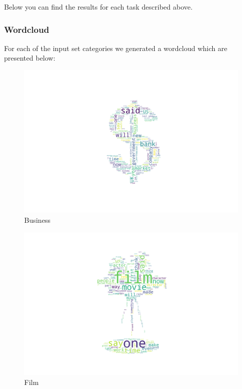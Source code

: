 Below you can find the results for each task described above.

\subsubsection{Wordcloud}
For each of the input set categories we generated a wordcloud which are presented below:

\begin{figure}[H]
\centering
\includegraphics[scale=0.35]{images/Wordcloud_Business.png}
\caption{Business}
\end{figure}

\begin{figure}[H]
\centering
\includegraphics[scale=0.35]{images/Wordcloud_Film.png}
\caption{Film}
\end{figure}

